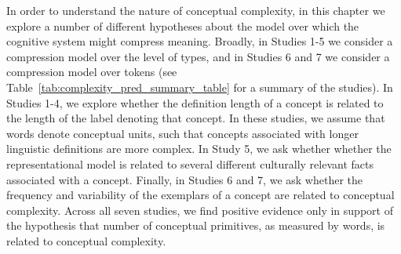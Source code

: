 In order to understand the nature of conceptual complexity, in this chapter we explore a number of different hypotheses about the model over which the cognitive system might compress meaning. Broadly, in Studies 1-5 we consider a compression model over the level of types, and in Studies 6 and 7 we consider a compression model over tokens (see Table~\ref{tab:complexity_pred_summary_table} for a summary of the studies). In Studies 1-4, we explore whether the definition length of a concept  is related to the length of the label denoting that concept. In these studies, we assume that words denote conceptual units, such that concepts associated with longer linguistic definitions are  more complex. In Study 5, we ask whether whether the representational model is related to several different culturally relevant facts associated with a concept. Finally, in Studies 6 and 7, we ask whether the frequency and variability of the exemplars of a concept are related to conceptual complexity.  Across all seven studies, we find positive evidence only in support of the hypothesis that number of conceptual primitives, as measured by words, is related to conceptual complexity.





 



